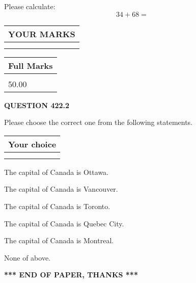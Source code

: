 \documentclass[12pt]{article}
\begin{document}
  
 
Please calculate:
\begin{equation}
34 +  %
68 = \nonumber
\end{equation}
 

 

 
  
\vspace{0.2in}
  
\noindent\begin{tabular}{|l|}
\hline
 YOUR MARKS  \\
\hline
 \\ 
 \\ 
\hline
\end{tabular}
\hspace{0.05in} \begin{tabular}{|l|}
\hline
 Full Marks  \\
\hline
 \\ 
50.00 \\
\hline
\end{tabular}
{\textbf{\Large{QUESTION
422.2 
}}}
  
  
Please choose the correct one from the following statements.
  
  
\noindent\hspace{3.0in} \begin{tabular}{|l|}
\hline
Your choice \\
\hline
 \\ 
 \\ 
\hline
\end{tabular}
  
  
 
 
The capital of Canada is Ottawa.
 
 
The capital of Canada is Vancouver.
 
 
The capital of Canada is Toronto.
 
 
The capital of Canada is Quebec City.
 
 
The capital of Canada is Montreal.
 
 
 None of above.
 
 
   
   
 \vspace{0.2in}
 
   
   
   
   
\vspace{1.0in} 
{\textbf{\large{ *** END OF PAPER, THANKS *** }}} 
   
\end{document}
